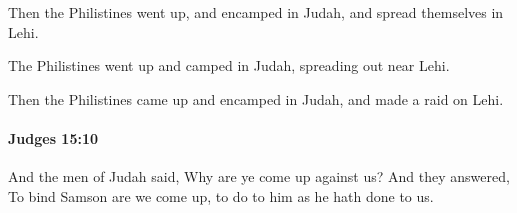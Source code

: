 			\begin{versebox}
					\item[BHS] 
					\item[ASV] Then the Philistines went up, and encamped in Judah, and spread themselves in Lehi.
					\item[NIV] The Philistines went up and camped in Judah, spreading out near Lehi.
					\item[NRSV] Then the Philistines came up and encamped in Judah, and made a raid on Lehi.
			\end{versebox}

		\paragraph{Judges 15:10} %
			\label{JUDGES-15-10}

			And the men of Judah said, Why are ye come up against us? And they answered, To bind Samson are we come up, to do to him as he hath done to us.


